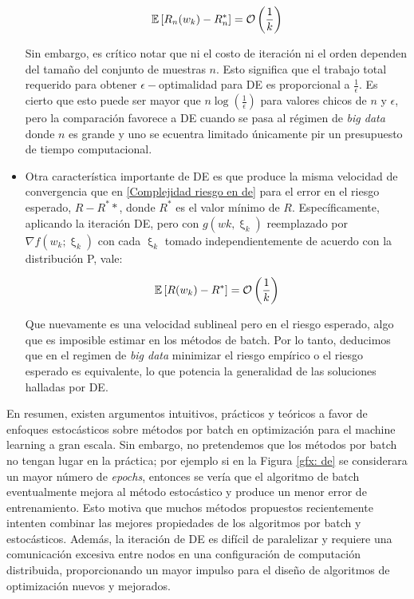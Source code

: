 \begin{itemize}
	\begin{equation}
	\label{Complejidad riesgo en de}
	\mathbb{E} \left[R_n(w_k) - R_n^*\right] = \mathcal{O} \left(\frac{1}{k}\right)
	\end{equation}
	
	Sin embargo, es cr\'itico notar que ni el costo de iteración ni el orden dependen del tamaño del conjunto de muestras $n$. Esto significa que el trabajo total requerido para obtener $\epsilon-$optimalidad para DE es proporcional a $\frac{1}{\epsilon}$. Es cierto que esto puede ser mayor que $n \log \left(\frac{1}{\epsilon}\right)$ para valores chicos de $n$ y $\epsilon$, pero la comparación favorece a DE cuando se pasa al régimen de \textit{big data} donde $n$ es grande y uno se ecuentra limitado \'unicamente pir un presupuesto de tiempo computacional.
	
	\item Otra característica importante de DE es que produce la misma velocidad de convergencia que en \ref{Complejidad riesgo en de} para el error en el riesgo esperado, $R - R^**$, donde $R^*$ es el valor mínimo de $R$. Específicamente, aplicando la iteración DE, pero con $g(wk, \upxi_{k})$ reemplazado por $\nabla f (w_k; \upxi_{k})$ con cada $\upxi_{k}$ tomado independientemente de acuerdo con la distribución P, vale:
	
	\begin{equation}
	\mathbb{E} \left[R(w_k) - R^*\right] = \mathcal{O} \left(\frac{1}{k}\right)
	\end{equation}
	
	Que nuevamente es una velocidad sublineal pero en el riesgo esperado, algo que es imposible estimar en los m\'etodos de batch. Por lo tanto, deducimos que en el regimen de \textit{big data} minimizar el riesgo emp\'irico o el riesgo esperado es equivalente, lo que potencia la generalidad de las soluciones halladas por DE.
	
\end{itemize}

En resumen, existen argumentos intuitivos, prácticos y teóricos a favor de enfoques estocásticos sobre m\'etodos por batch en optimización para el machine learning a gran escala. Sin embargo, no pretendemos que los métodos por batch no tengan lugar en la práctica; por ejemplo si en la Figura \ref{gfx: de} se considerara un mayor número de \textit{epochs}, entonces se vería que el algoritmo de batch eventualmente mejora al método estocástico y produce un menor error de entrenamiento. Esto motiva que muchos métodos propuestos recientemente intenten combinar las mejores propiedades de los algoritmos por batch y estocásticos. Además, la iteración de DE es difícil de paralelizar y requiere una comunicación excesiva entre nodos en una configuración de computación distribuida, proporcionando un mayor impulso para el diseño de algoritmos de optimización nuevos y mejorados. \cite{agarwal:2017} \cite{atchade:2014}

